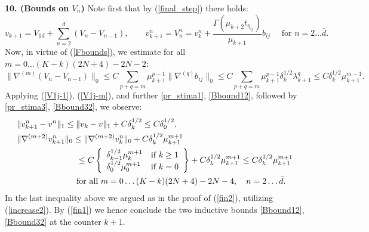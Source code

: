 \documentclass[reqno,twoside,11pt]{amsart}
\numberwithin{equation}{section}
\theoremstyle{plain}
\theoremstyle{definition}
\begin{document}
{\bf 10. (Bounds on $V_n$)} Note first that by (\ref{final_step}) there holds:
\begin{equation*}
 v_{k+1} = V_{1d} + \sum_{n=2}^{\bar d} (V_n - V_{n-1}),
\qquad v_{k+1}^n=V_n^n = v_k^n +
\frac{\Gamma(\mu_{k+2}t_{\eta_{ij}})}{\mu_{k+1}} b_{ij} \quad\mbox{ for
 } n=2\ldots\bar d.
\end{equation*}
Now, in virtue of (\ref{Fbounds}), we estimate for all $m=0\ldots (K-k)(2N+4)-2N-2$:
$$\|\nabla^{(m)}(V_n-V_{n-1})\|_0\leq C\sum_{p+q=m}\mu_{k+1}^{p-1}\|\nabla^{(q)}b_{ij}\|_0
\leq C \sum_{p+q=m} \mu_{k+1}^{p-1}\delta_k^{1/2}\lambda_{k+1}^q\leq
C\delta_{k}^{1/2}\mu_{k+1}^{m-1}.$$
Applying (\ref{V1j-1}), (\ref{V1j-m}), and further \ref{pr_stima1},
\ref{Bbound12}, followed by \ref{pr_stima3}, \ref{Bbound32}, we observe:
\begin{equation*}
\begin{split}
& \|v_{k+1}^n-v^n\|_1\leq \|v_{k}-v\|_1+ C\delta_{k}^{1/2}\leq C\delta_0^{1/2},
\\ & \|\nabla^{(m+2)} v_{k+1}^n\|_0\leq \|\nabla^{(m+2)} v_{k}^n\|_0 +
C\delta_{k}^{1/2}\mu_{k+1}^{m+1} \\ & \hspace{2.5cm}\leq C\left\{\begin{array}{ll}
    \delta_{k-1}^{1/2}\mu_k^{m+1} & \mbox{if } k\geq 1 \\
    \delta_0^{1/2}\mu_0^{m+1} & \mbox{if } k = 0 
\end{array}\right\} +  C\delta_{k}^{1/2}\mu_{k+1}^{m+1} \leq
C\delta_{k}^{1/2}\mu_{k+1}^{m+1} \\ 
& \hspace{2.5cm}\mbox{for all } m=0\ldots (K-k)(2N+4)-2N-4, \quad 
n=2\ldots \bar d.
\end{split}
\end{equation*}
In the last inequality above we argued as in the proof of (\ref{fin2}), utilizing (\ref{increase2}). 
By (\ref{fin1}) we hence conclude the two inductive bounds \ref{Bbound12},
\ref{Bbound32} at the counter $k+1$.

\medskip
\end{document}
